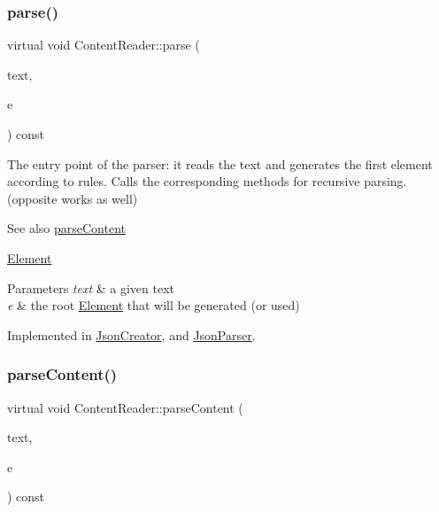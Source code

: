 \subsubsection{\texorpdfstring{parse()}{parse()}}
{\footnotesize\ttfamily virtual void Content\+Reader\+::parse (\begin{DoxyParamCaption}\item[{std\+::string \&}]{text,  }\item[{\mbox{\hyperlink{classElement}{Element}} $\ast$$\ast$}]{e }\end{DoxyParamCaption}) const\hspace{0.3cm}{\ttfamily [pure virtual]}}

The entry point of the parser\+: it reads the text and generates the first element according to rules. Calls the corresponding methods for recursive parsing. (opposite works as well) \begin{DoxySeeAlso}{See also}
\mbox{\hyperlink{classContentReader_a7eef37b8b9761e21c0a3907ff94c72f7}{parse\+Content}} 

\mbox{\hyperlink{classElement}{Element}}
\end{DoxySeeAlso}

\begin{DoxyParams}{Parameters}
{\em text} & a given text \\
\hline
{\em e} & the root \mbox{\hyperlink{classElement}{Element}} that will be generated (or used) \\
\hline
\end{DoxyParams}


Implemented in \mbox{\hyperlink{classJsonCreator_a505ff309c6b144d29478804b0e187c6f}{Json\+Creator}}, and \mbox{\hyperlink{classJsonParser_a3ec3a9fcc8a63f987b4749d60b0568df}{Json\+Parser}}.

\mbox{\label{classContentReader_a7eef37b8b9761e21c0a3907ff94c72f7}} 
\subsubsection{\texorpdfstring{parse\+Content()}{parseContent()}\hspace{0.1cm}{\footnotesize\ttfamily [1/6]}}
{\footnotesize\ttfamily virtual void Content\+Reader\+::parse\+Content (\begin{DoxyParamCaption}\item[{std\+::string \&}]{text,  }\item[{\mbox{\hyperlink{classElementInt}{Element\+Int}} $\ast$}]{e }\end{DoxyParamCaption}) const\hspace{0.3cm}{\ttfamily [pure virtual]}}

